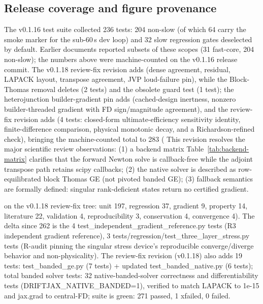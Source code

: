 \documentclass[11pt,a4paper]{article}
\numberwithin{equation}{section}
\begin{document}
\subsection{Release coverage and figure provenance}
The v0.1.16 test suite collected 236 tests: 204 non-slow (of which 64
carry the smoke marker for the sub-60\,s dev loop) and 32 slow
regression gates deselected by default. Earlier documents reported
subsets of these scopes (31 fast-core, 204 non-slow); the numbers above
were machine-counted on the v0.1.16 release commit. The v0.1.18 review-fix revision
adds  (dense agreement,
residual, LAPACK layout, transpose agreement, JVP loud-failure pin),
while the Block-Thomas removal deletes 
(2 tests) and the obsolete  guard test (1 test); the
heterojunction builder-gradient pin adds
 (cached-design
inertness, nonzero builder-threaded gradient with FD sign/magnitude
agreement), and the review-fix revision adds
 (4 tests:
closed-form ultimate-efficiency sensitivity identity, finite-difference
comparison, physical monotonic decay, and a Richardson-refined check),
bringing the machine-counted total to 283 (
This revision resolves the major scientific review observations: (1) a backend matrix
Table~\ref{tab:backend-matrix} clarifies that the forward Newton solve is callback-free
while the adjoint transpose path retains scipy callbacks; (2) the native solver is described
as row-equilibrated block Thomas GE (not pivoted banded GE); (3) fallback semantics are
formally defined: singular rank-deficient states return no certified gradient.

on the v0.1.18 review-fix tree: unit 197, regression 37, gradient 9,
property 14, literature 22, validation 4, reproducibility 3,
conservation 4, convergence 4). The delta since 262 is the 4
test\_independent\_gradient\_reference.py tests (R3 independent gradient
reference), 3 tests/regression/test\_three\_layer\_stress.py tests
(R-audit pinning the singular stress device's reproducible converge/diverge
behavior and non-physicality). The review-fix revision (v0.1.18) also adds 19 tests: test\_banded\_ge.py (7 tests) + updated test\_banded\_native.py (6 tests); total banded solver tests: 32 native-banded-solver correctness and differentiability tests (DRIFTJAX\_NATIVE\_BANDED=1), verified to match LAPACK to 1e-15 and jax.grad to central-FD; suite is green: 271 passed, 1 xfailed, 0 failed.
\end{document}
